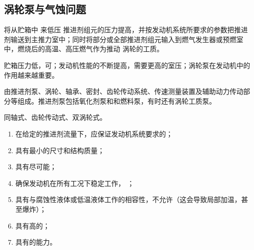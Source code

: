 \subsection{涡轮泵与气蚀问题}

\sssection[涡轮泵功能及组成]


\blue[功能] \quad 将从贮箱中 来低压 推进剂组元的压力提高，并按发动机系统所要求的参数把推进剂输送到主推力室中；同时将部分或全部推进剂组元输入到燃气发生器或预燃室中，燃烧后的高温、高压燃气作为推动
涡轮的工质。

\blue[重要性] \quad 贮箱压力低，可\red[大大减轻结构质量]；发动机性能的不断提高，需要更高的室压；涡轮泵在发动机中的作用越来越重要。

\blue[组成] \quad 由推进剂泵、涡轮、轴承、密封、齿轮传动系统、传速测量装置及辅助动力传动部分等组成。推进剂泵包括氧化剂泵和和燃料泵，有时还有涡轮工质泵。

\blue[涡轮和泵的传动和配置方式] \quad 同轴式、齿轮传动式、双涡轮式。
\vspace*{0.2em}

\blue[对涡轮泵的要求] 
\vspace*{-0.5em}
\begin{enumerate}[\hspace*{3em} $\bigstar$]
	\item 在给定的推进剂流量下，应保证发动机系统要求的\red[出口压力值]；\vspace*{-0.5em}
	\item 具有最小的尺寸和结构质量；\vspace*{-0.5em}
	\item 具有尽可能\red[高的效率]；\vspace*{-0.5em}
	\item 确保发动机在所有工况下稳定工作， \red[压力脉动与机械振动很小]；\vspace*{-0.5em}
	\item 具有与腐蚀性液体或低温液体工作的相容性，不允许\red[氧化剂泵零件间有摩擦]（这会导致局部加温，甚至爆炸）；\vspace*{-0.5em}
	\item 具有高的\red[抗气蚀性能]；\vspace*{-0.5em}
	\item 具有\red[抽吸含少量气体或蒸汽的推进剂]的能力。\vspace*{-0.5em}
\end{enumerate}
\vspace*{1em}

